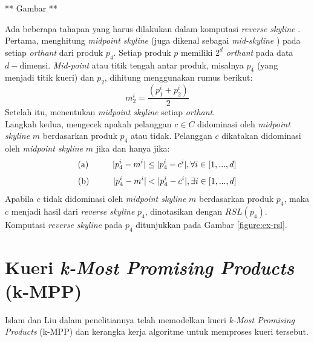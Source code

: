 ** Gambar **

Ada beberapa tahapan yang harus dilakukan dalam komputasi \textit{reverse skyline} \cite{kmpp}. Pertama, menghitung \textit{midpoint skyline} (juga dikenal sebagai \textit{mid-skyline} \cite{mid-skyline}) pada setiap \textit{orthant} dari produk $p_4$. Setiap produk $p$ memiliki $2^d$ \textit{orthant} pada data $d-$dimensi. \textit{Mid-point} atau titik tengah antar produk, misalnya $p_4$ (yang menjadi titik kueri) dan $p_2$, dihitung menggunakan rumus berikut: 
\begin{equation} \label{eq:midpoint}
m_2^i = \frac{(p_1^i + p_2^i)}{2}
\end{equation}
Setelah itu, menentukan \textit{midpoint skyline} setiap \textit{orthant}.\\
\tab Langkah kedua, mengecek apakah pelanggan $c \in C$ didominasi oleh \textit{midpoint skyline} $m$ berdasarkan produk $p_4$ atau tidak. Pelanggan $c$ dikatakan didominasi oleh \textit{midpoint skyline} $m$ jika dan hanya jika:\\
\[\text{(a)} \hspace*{1cm} |p_4^i - m^i| \leq |p_4^i - c^i|, \forall i \in [1, ..., d]\]
\[\text{(b)} \hspace*{1cm} |p_4^i - m^i| < |p_4^i - c^i|, \exists i \in [1, ..., d]\]
Apabila $c$ tidak didominasi oleh \textit{midpoint skyline} $m$ berdasarkan produk $p_4$, maka $c$ menjadi hasil dari \textit{reverse skyline} $p_4$, dinotasikan dengan $RSL(p_4)$. Komputasi \textit{reverse skyline} pada $p_4$ ditunjukkan pada Gambar \ref{figure:ex-rsl}.


\section{Kueri \textit{k-Most Promising Products} (k-MPP)}
\tab Islam dan Liu dalam penelitiannya \cite{kmpp} telah memodelkan kueri \textit{k-Most Promising Products} (k-MPP) dan kerangka kerja algoritme untuk memproses kueri tersebut. 

